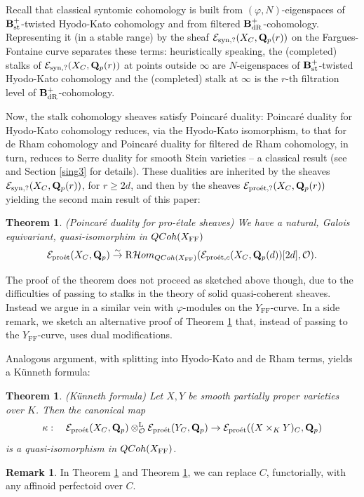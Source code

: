 \documentclass[10pt,reqno]{amsart}
\let\cal\mathcal
\newtheorem{theorem}[equation]{Theorem}
\theoremstyle{definition}
\newtheorem{remark}[equation]{Remark}
\theoremstyle{remark}
\def\phi{\varphi}
\newcommand{\dr}{\operatorname{dR} }
\newcommand{\proeet}{\operatorname{pro\acute{e}t} }
\newcommand{\Hhom}{{\cal Hom}}
\newcommand{\synt}{ \operatorname{syn} }
\newcommand{\st}{\operatorname{st} }
\newcommand{\LL}{\operatorname{L} }
\newcommand{\FF}{\operatorname{FF} }
\newcommand{\so}{{\mathcal O}}
\newcommand{\se}{{\mathcal{E}}}
\numberwithin{equation}{section}
\def\R{{\mathrm R}}
\def\Q{{\bf Q}} \def\Z{{\bf Z}}
\def\KAPPA{$\kappa$, $\kappa_{\rm HT}$, $\kappa_{\rm dR}$, $\kappa^{[u,v]}$}
\numberwithin{equation}{section}
\begin{document}
  
  Recall that classical syntomic cohomology is built from $(\phi,N)$-eigenspaces of $\B^+_{\st}$-twisted Hyodo-Kato cohomology and from filtered $\B^+_{\dr}$-cohomology. Representing it (in a stable range) by the sheaf $\se_{\synt,?}(X_C, \Q_p(r))$ on the Fargues-Fontaine curve separates these terms: heuristically speaking,  the (completed) stalks of $\se_{\synt,?}(X_C, \Q_p(r))$ at points outside $\infty$ are $N$-eigenspaces of $\B^+_{\st}$-twisted Hyodo-Kato cohomology and the (completed) stalk at $\infty$ is the $r$-th filtration level of 
 $\B^+_{\dr}$-cohomology. 
 
 Now, the   stalk cohomology sheaves   satisfy Poincar\'e duality: Poincar\'e duality for Hyodo-Kato cohomology reduces, via the Hyodo-Kato isomorphism, to that for de Rham cohomology and Poincar\'e duality for filtered de Rham cohomology, in turn, reduces to Serre duality for smooth Stein varieties -- a classical result (see \cite{AGN} and Section \ref{sing3} for details).
  These dualities are  inherited by the sheaves $\se_{\synt,?}(X_C, \Q_p(r))$, for $r\geq 2d$,  and then by the  sheaves $\se_{\proeet,?}(X_C, \Q_p(r))$ yielding  the second main result of this paper:
 \begin{theorem} 
{\rm (Poincar\'e duality for pro-\'etale sheaves)} \label{first1}  
We have a natural, Galois equivariant,  quasi-isomorphim in ${\rm QCoh}(X_{\FF})$
 \begin{equation}\label{first}
 \se_{\proeet}(X_C, \Q_p)\stackrel{\sim}{\to} \R\Hhom_{{\rm QCoh}(X_{\FF})}(\se_{\proeet,c}(X_C, \Q_p(d))[2d],\so).
 \end{equation}
 \end{theorem}

 The proof of the theorem does not proceed as sketched above though,
 due to the difficulties of passing to stalks in the theory of solid quasi-coherent sheaves.
 Instead we argue in a similar vein with $\phi$-modules on the $Y_{\FF}$-curve.
 In a side remark,
 we sketch an alternative proof of Theorem \ref{first1}
 that, instead of passing to the $Y_{\FF}$-curve, uses dual modifications.
 
  Analogous argument, with splitting into Hyodo-Kato and de Rham terms, yields a K\"unneth formula:
 \begin{theorem}{\rm(K\"unneth formula)} 
\label{first2} Let $X,Y$ be smooth partially proper varieties over $K$. 
 Then the  canonical  \index{KAPPA@\KAPPA}map 
 $$
\kappa:\quad   \se_{\proeet}(X_C,\Q_p)\otimes^{\LL}_{\so} \se_{\proeet}(Y_C,\Q_p) \to \se_{\proeet}((X\times_K Y)_C,\Q_p)
 $$
 is a quasi-isomorphism in ${\rm QCoh}(X_{\FF})$. 
 \end{theorem}
\begin{remark} In Theorem \ref{first1} and Theorem \ref{first2}, we can replace $C$, functorially, with any affinoid perfectoid over $C$. 
\end{remark}
\end{document}
